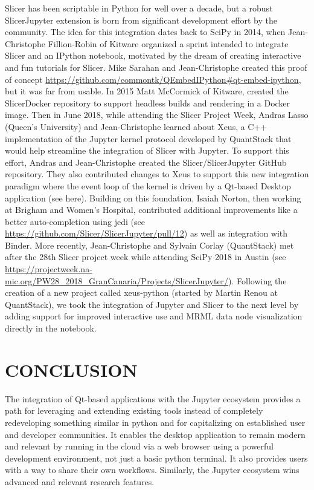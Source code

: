 \documentclass{IEEEcsmag}
\begin{document}
Slicer has been scriptable in Python for well over a decade, but a robust SlicerJupyter \cite{slicer-jupyter} extension is born from significant development effort by the community. The idea for this integration dates back to SciPy in 2014, when Jean-Christophe Fillion-Robin of Kitware organized a sprint intended to integrate Slicer and an IPython notebook, motivated by the dream of creating interactive and fun tutorials for Slicer. Mike Sarahan and Jean-Christophe created this proof of concept \url{https://github.com/commontk/QEmbedIPython#qt-embed-ipython}, but it was far from usable. In 2015 Matt McCormick of Kitware, created the SlicerDocker repository to support headless builds and rendering in a Docker image. Then in June 2018, while attending the Slicer Project Week, Andras Lasso (Queen’s University) and Jean-Christophe learned about Xeus, a C++ implementation of the Jupyter kernel protocol developed by QuantStack that would help streamline the integration of Slicer with Jupyter. To support this effort, Andras and Jean-Christophe created the Slicer/SlicerJupyter GitHub repository. They also contributed changes to Xeus to support this new integration paradigm where the event loop of the kernel is driven by a Qt-based Desktop application (see here). Building on this foundation, Isaiah Norton, then working at Brigham and Women’s Hospital, contributed additional improvements like a better auto-completion using jedi (see \url{https://github.com/Slicer/SlicerJupyter/pull/12}) as well as integration with Binder. More recently, Jean-Christophe and Sylvain Corlay (QuantStack) met after the 28th Slicer project week while attending SciPy 2018 in Austin (see \url{https://projectweek.na-mic.org/PW28_2018_GranCanaria/Projects/SlicerJupyter/}). Following the creation of a new project called xeus-python (started by Martin Renou at QuantStack), we took the integration of Jupyter and Slicer to the next level by adding support for improved interactive use and MRML data node visualization directly in the notebook.


\section{CONCLUSION}

The integration of Qt-based applications with the Jupyter ecosystem provides a path for leveraging and extending existing tools instead of completely redeveloping something similar in python and for capitalizing on established user and developer communities. It enables the desktop application to remain modern and relevant by running in the cloud via a web browser using a powerful development environment, not just a basic python terminal. It also provides users with a way to share their own workflows. Similarly, the Jupyter ecosystem wins advanced and relevant research features. 
\end{document}

